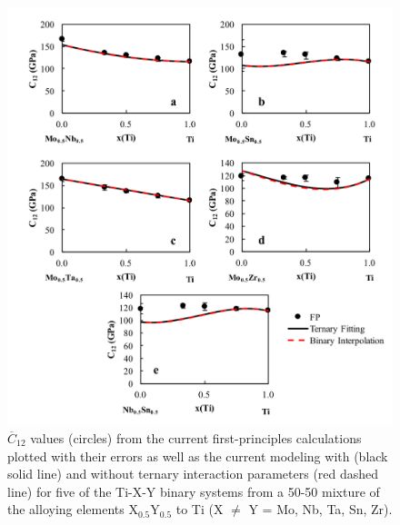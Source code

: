 \pagebreak
\begin{figure}[H]
	\centering
	\includegraphics[width=\textwidth]{Chapter-6/Figures/tixyc121.png}
	\caption{$\overline{C}_{12}$ values (circles) from the current first-principles calculations plotted with their errors as well as the current modeling with (black solid line) and without ternary interaction parameters (red dashed line) for five of the Ti-X-Y binary systems from a 50-50 mixture of the alloying elements X$_{0.5}$Y$_{0.5}$ to Ti (X $\neq$ Y = Mo, Nb, Ta, Sn, Zr).}
	\label{Ch6-figure:tixyc12_1}
\end{figure}

